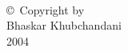 
\thispagestyle{empty}
\hbox{\ }

\vfill
\renewcommand{\baselinestretch}{1}
\small\normalsize


\begin{center}
\large{\copyright \hbox{ }Copyright by\\
Bhaskar Khubchandani  %
\\
2004}
\end{center}

\vfill

\newpage
